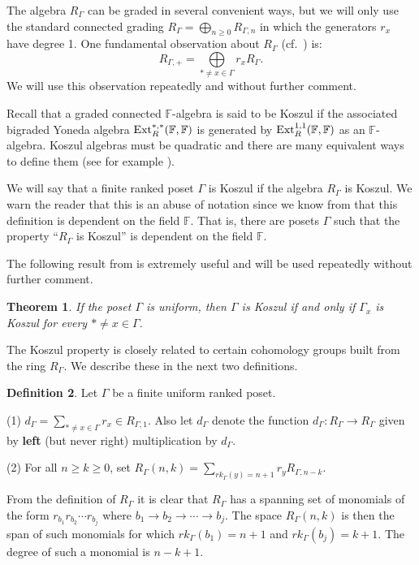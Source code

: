 \documentclass[11pt,righttag]{amsart}
\newtheorem{thm}{Theorem}[section]
\theoremstyle{definition}
\newtheorem{defn}[thm]{Definition}
\begin{document}
The algebra $R_\Gamma$ can be graded in several convenient ways, but we will only use the standard connected grading
 $R_\Gamma= \bigoplus\limits_{n\ge 0}R_{\Gamma,n}$ in which the generators $r_x$ have degree 1.  One fundamental observation about $R_\Gamma$ (cf.~\cite{CPS}) is:
$$ R_{\Gamma,+}=  \bigoplus\limits_{*\ne x\in \Gamma} r_x R_\Gamma.$$
We will use this observation repeatedly and without further comment.

Recall that a graded connected ${{\mathbb F}}$-algebra is said to be Koszul if the associated bigraded Yoneda algebra ${\hbox{{\rm Ext}}}_R^{*,*}({{\mathbb F}},{{\mathbb F}})$ is generated  by ${\hbox{{\rm Ext}}}_R^{1,1}({{\mathbb F}},{{\mathbb F}})$ as an ${{\mathbb F}}$-algebra.  Koszul algebras must be quadratic and there are many equivalent ways to define them (see for example \cite{PP}).

We will say that a finite ranked poset $\Gamma$ is Koszul if the algebra $R_\Gamma$ is Koszul.  We warn the reader that this is an abuse of notation since we know from \cite{CPS} that this definition is dependent on the field ${{\mathbb F}}$. That is, there are posets $\Gamma$ such that the property ``$R_\Gamma$ is Koszul'' is dependent on the field ${{\mathbb F}}$.  

The following result from 
\cite{CPS} is extremely useful and will be used repeatedly without further comment.

\begin{thm}\label{useful} If the poset $\Gamma$ is uniform, then 
$\Gamma$ is Koszul if and only if $\Gamma_x$ is Koszul for every $*\ne x\in \Gamma$.
\end{thm}

The Koszul property is closely related to certain cohomology groups built from the ring $R_\Gamma$.  We describe these in the next two definitions.

\begin{defn}
Let $\Gamma$ be a finite uniform ranked poset.

(1) $d_\Gamma = \sum\limits_{*\ne x\in \Gamma} r_x \in R_{\Gamma,1}$.  Also let $d_\Gamma$ denote the function 
$d_\Gamma: R_\Gamma \to R_\Gamma$ given by {\bf left} (but never right) multiplication by $d_\Gamma$.  

(2) For all $n\ge k\ge 0$, set $R_\Gamma(n,k) = \sum\limits_{rk_\Gamma(y) = n+1} r_y R_{\Gamma,n-k}$.

\end{defn}

From the definition of $R_\Gamma$ it is clear that $R_\Gamma$ has a spanning set of monomials of the form $r_{b_1}r_{b_2}\cdots r_{b_j}$ where $b_1\to b_2\to \cdots \to b_j$.   The space $R_\Gamma(n,k)$ is then the span of such monomials for which $rk_\Gamma(b_1) = n+1$ and $rk_\Gamma(b_j) = k+1$. The degree of such a monomial is $n-k+1$. 
\end{document}
